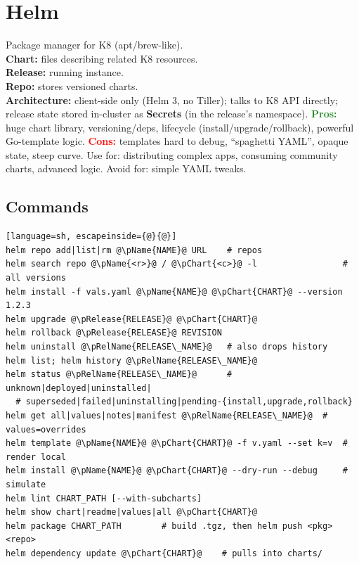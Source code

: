 \section{Helm}
Package manager for K8 (apt/brew-like).\\
\textbf{Chart:} files describing related K8 resources. \\
\textbf{Release:} running instance. \\
\textbf{Repo:} stores versioned charts. \\
\textbf{Architecture:} client-side only (Helm 3, no Tiller); talks to K8 API directly; release state stored in-cluster as \textbf{Secrets} (in the release's namespace).
\textcolor{ForestGreen}{\textbf{Pros:}} huge chart library, versioning/deps, lifecycle (install/upgrade/rollback), powerful Go-template logic.
\textcolor{red}{\textbf{Cons:}} templates hard to debug, ``spaghetti YAML'', opaque state, steep curve. Use for: distributing complex apps, consuming community charts, advanced logic. Avoid for: simple YAML tweaks.

\subsection{Commands}
\begin{lstlisting}[language=sh, escapeinside={@}{@}]
helm repo add|list|rm @\pName{NAME}@ URL    # repos
helm search repo @\pName{<r>}@ / @\pChart{<c>}@ -l                 # all versions
helm install -f vals.yaml @\pName{NAME}@ @\pChart{CHART}@ --version 1.2.3
helm upgrade @\pRelease{RELEASE}@ @\pChart{CHART}@
helm rollback @\pRelease{RELEASE}@ REVISION
helm uninstall @\pRelName{RELEASE\_NAME}@   # also drops history
helm list; helm history @\pRelName{RELEASE\_NAME}@
helm status @\pRelName{RELEASE\_NAME}@      # unknown|deployed|uninstalled|
  # superseded|failed|uninstalling|pending-{install,upgrade,rollback}
helm get all|values|notes|manifest @\pRelName{RELEASE\_NAME}@  # values=overrides
helm template @\pName{NAME}@ @\pChart{CHART}@ -f v.yaml --set k=v  # render local
helm install @\pName{NAME}@ @\pChart{CHART}@ --dry-run --debug     # simulate
helm lint CHART_PATH [--with-subcharts]
helm show chart|readme|values|all @\pChart{CHART}@
helm package CHART_PATH        # build .tgz, then helm push <pkg> <repo>
helm dependency update @\pChart{CHART}@    # pulls into charts/
\end{lstlisting}

